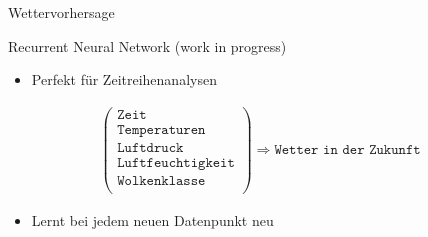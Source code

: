 \begin{frame}[t]{Wettervorhersage}
  \begin{block}{Recurrent Neural Network \tiny\alert{(work in progress)}}
    \begin{itemize}
      \item Perfekt für Zeitreihenanalysen
    \end{itemize}
    \begin{align*}
      \left(\begin{matrix}
          \texttt{Zeit} \\
          \texttt{Temperaturen} \\
          \texttt{Luftdruck} \\
          \texttt{Luftfeuchtigkeit} \\
          \texttt{Wolkenklasse} \\
      \end{matrix}\right)
      \Longrightarrow \texttt{Wetter in der Zukunft}
    \end{align*}
    \begin{itemize}
      \item Lernt bei jedem neuen Datenpunkt neu
    \end{itemize}
  \end{block}
\end{frame}
